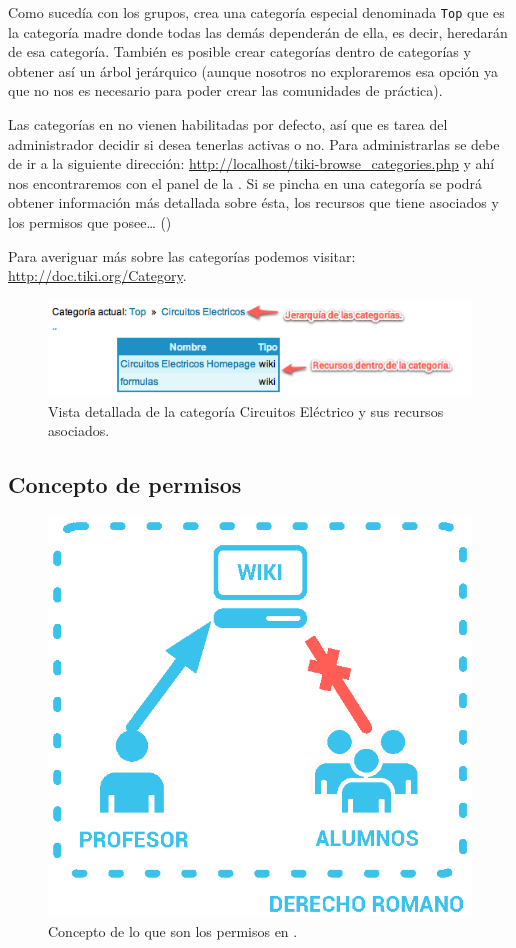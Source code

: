 Como sucedía con los grupos, \tiki{} crea una categoría especial denominada \texttt{Top} que es la categoría madre donde todas las demás dependerán de ella, es decir, heredarán de esa categoría. También es posible crear categorías dentro de categorías y obtener así un árbol jerárquico (aunque nosotros no exploraremos esa opción ya que no nos es necesario para poder crear las comunidades de práctica).

Las categorías en \tiki{} no vienen habilitadas por defecto, así que es tarea del administrador decidir si desea tenerlas activas o no.
Para administrarlas se debe de ir a la siguiente dirección: \url{http://localhost/tiki-browse_categories.php} y ahí nos encontraremos con el panel de la . Si se pincha en una categoría se podrá obtener información más detallada sobre ésta, los recursos que tiene asociados y los permisos que posee\ldots{} () 

Para averiguar más sobre las categorías podemos visitar: \url{http://doc.tiki.org/Category}.

\begin{figure}
\centering
\includegraphics[scale=.8]{../graphics/fig_vista_categoria_circuitos.png}
\caption{Vista detallada de la categoría Circuitos Eléctrico y sus recursos asociados.}\label{fig:vista_categoria_circuitos}
\end{figure}

\subsection{Concepto de permisos}
\label{section:concepto-permisos}

\begin{figure}
\centering
\includegraphics[width=.8\linewidth]{../graphics/fig_comunidad_de_practica_derecho_permisos.eps}
\caption{Concepto de lo que son los permisos en \tiki{}.}\label{fig:concepto_permisos}
\end{figure}

